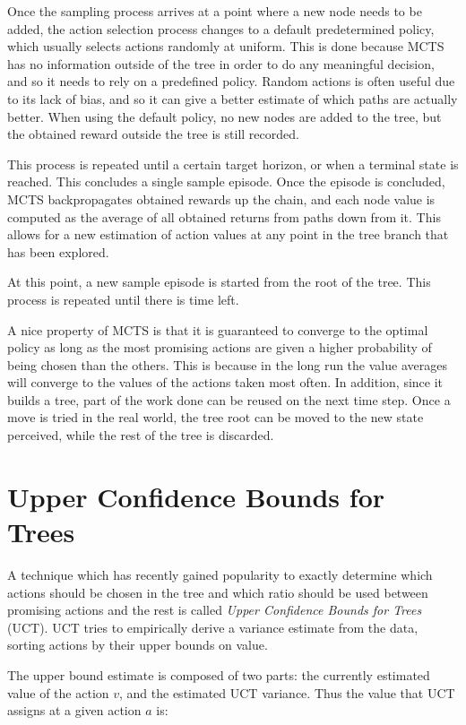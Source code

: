 Once the sampling process arrives at a point where a new node needs to be added, the action
selection process changes to a default predetermined policy, which usually selects actions randomly
at uniform. This is done because MCTS has no information outside of the tree in order to do any
meaningful decision, and so it needs to rely on a predefined policy. Random actions is often useful
due to its lack of bias, and so it can give a better estimate of which paths are actually better.
When using the default policy, no new nodes are added to the tree, but the obtained reward outside
the tree is still recorded.

This process is repeated until a certain target horizon, or when a terminal state is reached. This
concludes a single sample episode. Once the episode is concluded, MCTS backpropagates obtained
rewards up the chain, and each node value is computed as the average of all obtained returns from
paths down from it. This allows for a new estimation of action values at any point in the tree
branch that has been explored.

At this point, a new sample episode is started from the root of the tree. This process is repeated
until there is time left.

A nice property of MCTS is that it is guaranteed to converge to the optimal policy as long as the
most promising actions are given a higher probability of being chosen than the others. This is
because in the long run the value averages will converge to the values of the actions taken most
often.  In addition, since it builds a tree, part of the work done can be reused on the next time
step. Once a move is tried in the real world, the tree root can be moved to the new state perceived,
while the rest of the tree is discarded.


\section{Upper Confidence Bounds for Trees}

A technique which has recently gained popularity to exactly determine which actions should be chosen
in the tree and which ratio should be used between promising actions and the rest is called
\textit{Upper Confidence Bounds for Trees} (UCT). UCT tries to empirically derive a variance
estimate from the data, sorting actions by their upper bounds on value.

The upper bound estimate is composed of two parts: the currently estimated value of the action $v$,
and the estimated UCT variance. Thus the value that UCT assigns at a given action $a$ is:

